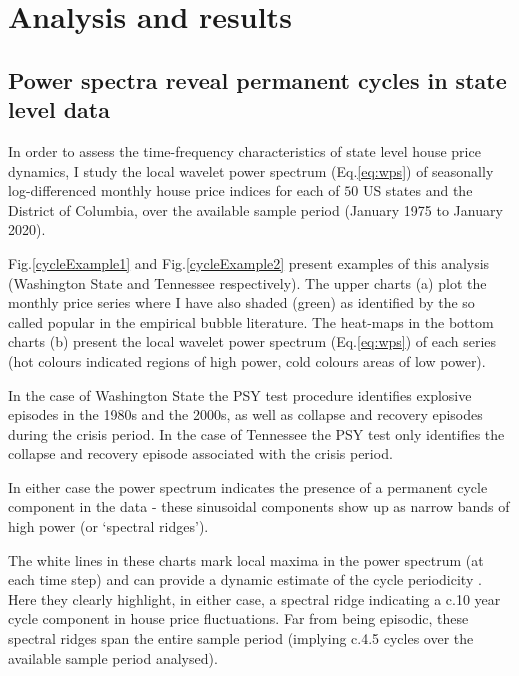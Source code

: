 \documentclass[11pt]{article}
\begin{document}
\section{Analysis and results} \label{Analysis}

\subsection{Power spectra reveal permanent cycles in state level data}

In order to assess the time-frequency characteristics of state level house price dynamics, I study the local wavelet power spectrum (Eq.\ref{eq:wps}) of seasonally log-differenced monthly house price indices for each of $50$ US states and the District of Columbia, over the available sample period (January 1975 to January 2020). %

Fig.\ref{cycleExample1} and Fig.\ref{cycleExample2} present examples of this analysis (Washington State and Tennessee respectively). The upper charts (a) plot the monthly price series where I have also shaded (green)  as identified by the so called  \citep{Shi2016, Phillips2015} popular in the empirical bubble literature. %
The heat-maps in the bottom charts (b) present the local wavelet power spectrum (Eq.\ref{eq:wps}) of each series (hot colours indicated regions of high power, cold colours areas of low power).

In the case of Washington State the PSY test procedure identifies explosive episodes in the 1980s and the 2000s, as well as collapse and recovery episodes during the crisis period. In the case of Tennessee the PSY test only identifies the collapse and recovery episode associated with the crisis period. 

In either case the power spectrum indicates the presence of a permanent cycle component in the data - these sinusoidal components show up as narrow bands of high power (or `spectral ridges'). 

The white lines in these charts mark local maxima in the power spectrum (at each time step) and can provide a dynamic estimate of the cycle periodicity \citep{Ramirez2015}. Here they clearly highlight, in either case, a spectral ridge indicating a c.10 year cycle component in house price fluctuations. Far from being episodic, these spectral ridges span the entire sample period (implying c.4.5 cycles over the available sample period analysed).
\end{document}
